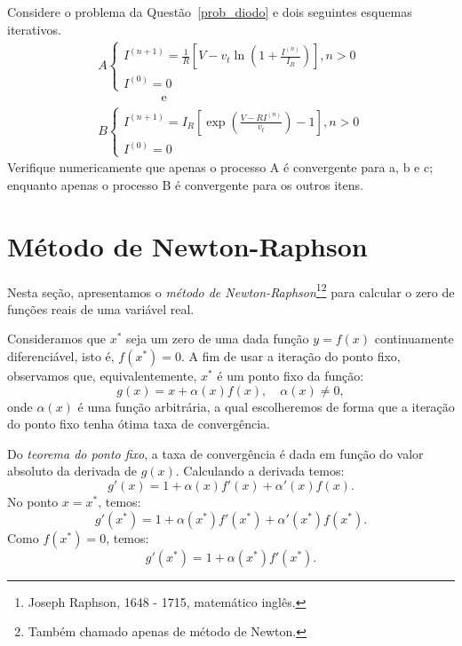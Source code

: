 \begin{ex}
\begin{exer} Considere o problema da Questão~\ref{prob_diodo} e dois seguintes esquemas iterativos.
\begin{equation}\begin{array}{l}
A\left\{
\begin{array}{ll}
I^{(n+1)}=\frac{1}{R}\left[V-v_t\ln\left(1+\frac{I^{(n)}}{I_R}\right)\right],n>0\\
I^{(0)}=0
\end{array}\right.\\ \hspace{2cm} \text{ e }\\
B\left\{
\begin{array}{ll}
I^{(n+1)}=I_R\left[\exp\left(\frac{V-RI^{(n)}}{v_t}\right)-1\right],n>0\\
I^{(0)}=0
\end{array}\right.
\end{array}
\end{equation}
Verifique numericamente que apenas o processo A é convergente para a, b e c; enquanto apenas o processo B é convergente para os outros itens.
\end{exer}

\section{Método de Newton-Raphson}\label{sec:metodo_newton_1d}

Nesta seção, apresentamos o \emph{método de Newton-Raphson}\footnote{Joseph Raphson, 1648 - 1715, matemático inglês.}\footnote{Também chamado apenas de método de Newton.} para calcular o zero de funções reais de uma variável real.

Consideramos que $x^*$ seja um zero de uma dada função $y = f(x)$ continuamente diferenciável, isto é, $f(x^*) = 0$. A fim de usar a iteração do ponto fixo, observamos que, equivalentemente, $x^*$ é um ponto fixo da função:
\begin{equation}
  g(x)= x + \alpha(x)f(x),\quad\alpha(x)\neq 0,
\end{equation}
onde $\alpha(x)$ é uma função arbitrária, a qual escolheremos de forma que a iteração do ponto fixo tenha ótima taxa de convergência.

Do \emph{teorema do ponto fixo}, a taxa de convergência é dada em função do valor absoluto da derivada de $g(x)$. Calculando a derivada temos:
\begin{equation}
  g'(x)=1+\alpha(x)f'(x)+\alpha'(x)f(x).
\end{equation}
No ponto $x = x^*$, temos:
\begin{equation}
  g'(x^*) = 1 + \alpha(x^*)f'(x^*) + \alpha'(x^*)f(x^*).
\end{equation}
Como $f(x^*)=0$, temos:
\begin{equation}
  g'(x^*) = 1 + \alpha(x^*)f'(x^*).
\end{equation}


\end{ex}
